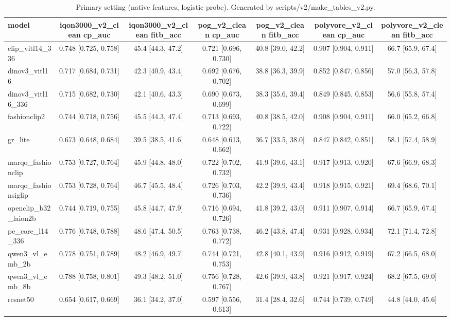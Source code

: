 \begin{table}[t]\centering\small
\caption{Primary setting (native features, logistic probe). Generated by scripts/v2/make_tables_v2.py.}\label{tab:v2-main}
\begin{tabular}{lcccccc}\toprule
model & iqon3000\_v2\_clean cp\_auc & iqon3000\_v2\_clean fitb\_acc & pog\_v2\_clean cp\_auc & pog\_v2\_clean fitb\_acc & polyvore\_v2\_clean cp\_auc & polyvore\_v2\_clean fitb\_acc \\\midrule
clip\_vitl14\_336 & 0.748 [0.725, 0.758] & 45.4 [44.3, 47.2] & 0.721 [0.696, 0.730] & 40.8 [39.0, 42.2] & 0.907 [0.904, 0.911] & 66.7 [65.9, 67.4] \\
dinov3\_vitl16 & 0.717 [0.684, 0.731] & 42.3 [40.9, 43.4] & 0.692 [0.676, 0.702] & 38.8 [36.3, 39.9] & 0.852 [0.847, 0.856] & 57.0 [56.3, 57.8] \\
dinov3\_vitl16\_336 & 0.715 [0.682, 0.730] & 42.1 [40.6, 43.3] & 0.690 [0.673, 0.699] & 38.3 [35.6, 39.4] & 0.849 [0.845, 0.853] & 56.6 [55.8, 57.4] \\
fashionclip2 & 0.744 [0.718, 0.756] & 45.5 [44.3, 47.4] & 0.713 [0.693, 0.722] & 40.8 [38.5, 42.0] & 0.908 [0.904, 0.911] & 66.0 [65.2, 66.8] \\
gr\_lite & 0.673 [0.648, 0.684] & 39.5 [38.5, 41.6] & 0.648 [0.613, 0.662] & 36.7 [33.5, 38.0] & 0.847 [0.842, 0.851] & 58.1 [57.4, 58.9] \\
marqo\_fashionclip & 0.753 [0.727, 0.764] & 45.9 [44.8, 48.0] & 0.722 [0.702, 0.732] & 41.9 [39.6, 43.1] & 0.917 [0.913, 0.920] & 67.6 [66.9, 68.3] \\
marqo\_fashionsiglip & 0.753 [0.728, 0.764] & 46.7 [45.5, 48.4] & 0.726 [0.703, 0.736] & 42.2 [39.9, 43.4] & 0.918 [0.915, 0.921] & 69.4 [68.6, 70.1] \\
openclip\_b32\_laion2b & 0.744 [0.719, 0.755] & 45.8 [44.7, 47.9] & 0.716 [0.694, 0.726] & 41.8 [39.2, 43.0] & 0.911 [0.907, 0.914] & 66.7 [65.9, 67.4] \\
pe\_core\_l14\_336 & 0.776 [0.748, 0.788] & 48.6 [47.4, 50.5] & 0.763 [0.738, 0.772] & 46.2 [43.8, 47.4] & 0.931 [0.928, 0.934] & 72.1 [71.4, 72.8] \\
qwen3\_vl\_emb\_2b & 0.778 [0.751, 0.789] & 48.2 [46.9, 49.7] & 0.744 [0.721, 0.753] & 42.8 [40.1, 43.9] & 0.916 [0.912, 0.919] & 67.2 [66.5, 68.0] \\
qwen3\_vl\_emb\_8b & 0.788 [0.758, 0.801] & 49.3 [48.2, 51.0] & 0.756 [0.728, 0.767] & 42.6 [39.9, 43.8] & 0.921 [0.917, 0.924] & 68.2 [67.5, 69.0] \\
resnet50 & 0.654 [0.617, 0.669] & 36.1 [34.2, 37.0] & 0.597 [0.556, 0.613] & 31.4 [28.4, 32.6] & 0.744 [0.739, 0.749] & 44.8 [44.0, 45.6] \\

\end{tabular}
\end{table}
